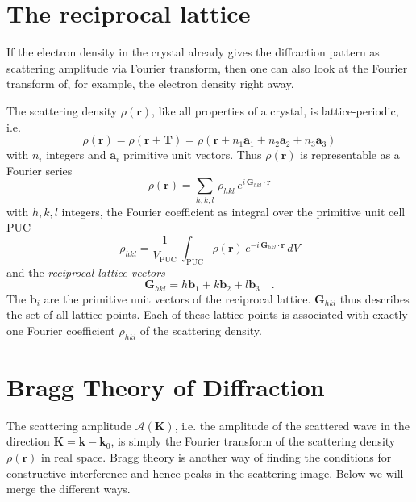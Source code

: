 \section{The reciprocal lattice}

If the electron density in the crystal already gives the diffraction pattern as scattering amplitude via Fourier transform, then one can also look at the Fourier transform of, for example, the electron density right away.

The scattering density $\rho(\mathbf{r})$, like all properties of a crystal, is lattice-periodic, i.e. 
\begin{equation}
  \rho(\mathbf{r}) = \rho(\mathbf{r} + \mathbf{T}) = \rho(\mathbf{r} + n_1 \mathbf{a}_1 + n_2 \mathbf{a}_2 + n_3 \mathbf{a}_3) 
\end{equation}
with $n_i$ integers and $\mathbf{a}_i$ primitive unit vectors. Thus $\rho(\mathbf{r})$ is representable as a Fourier series
\begin{equation}
  \rho(\mathbf{r}) = \sum_{h,k,l} \, \rho_{hkl} \, e^{i \, \mathbf{G}_{hkl} \cdot \mathbf{r}}
\end{equation}
with $h,k,l$ integers, the Fourier coefficient as integral over the primitive unit cell PUC
\begin{equation}
\rho_{hkl} = \frac{1}{V_\text{PUC}} \, \int_\text{PUC}    \rho(\mathbf{r})\, e^{-i \, \mathbf{G}_{hkl} \cdot \mathbf{r}} \, dV \label{eq:4_rho_hkl}
\end{equation}
and the  \emph{reciprocal lattice vectors}
\begin{equation}
\mathbf{G}_{hkl} = h \mathbf{b}_1 + k \mathbf{b}_2 + l \mathbf{b}_3 \quad .
\end{equation}
The $\mathbf{b}_i$ are the primitive unit vectors of the reciprocal lattice. $\mathbf{G}_{hkl}$ thus describes the set of all lattice points. Each of these lattice points is associated with exactly one Fourier coefficient $\rho_{hkl}$ of the scattering density. 


\section{Bragg Theory of Diffraction}

The scattering amplitude $\mathcal{A}(\mathbf{K})$, i.e. the amplitude of the scattered wave in the direction $\mathbf{K} = \mathbf{k} - \mathbf{k}_0$, is simply the Fourier transform of the scattering density $\rho(\mathbf{r})$ in real space. Bragg theory is another way of finding the conditions for constructive interference and hence peaks in the scattering image. Below we will merge the different ways.

